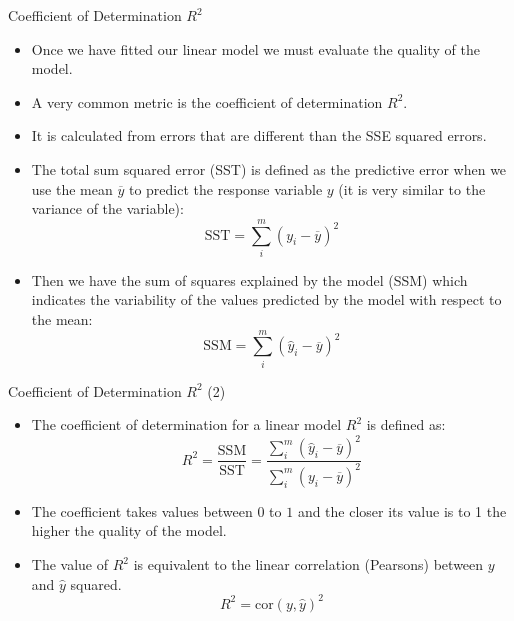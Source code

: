 \documentclass[handout]{beamer}
\begin{document}
\begin{frame}{Coefficient of Determination $R^2$}
\scriptsize{
\begin{itemize}
 \item  Once we have fitted our linear model we must evaluate the quality of the model.
 \item A very common metric is the coefficient of determination $R^2$. 
 \item  It is calculated from errors that are different than the SSE squared errors.
 \item The total sum squared error (SST)  is defined as the predictive error when we use the mean $\overline{y}$  to predict the response variable $y$ (it is very similar to the variance of the variable):
 \begin{displaymath}
  \text{SST} = \sum_{i}^{m}(y_i-\overline{y})^2  
 \end{displaymath}
 \item  Then we have the sum of squares explained by the model (SSM) which indicates the variability of the values predicted by the model with respect to the mean:
 \begin{displaymath}
  \text{SSM} = \sum_{i}^{m}(\hat{y}_i-\overline{y})^2 
 \end{displaymath}
  
\end{itemize}

}
\end{frame}

\begin{frame}{Coefficient of Determination $R^2$ (2)}
\scriptsize{
\begin{itemize}
 \item The coefficient of determination for a linear model $R^2$ is defined as:
 \begin{equation}
  R^2= \frac{\text{SSM}}{\text{SST}} = \frac{\sum_{i}^{m}(\hat{y}_i-\overline{y})^2 }{\sum_{i}^{m}(y_i-\overline{y})^2  }
 \end{equation}

 \item The coefficient takes values between $0$ to $1$ and the closer its value is to 1 the higher the quality of the model.
 
 \item The value of $R^2$ is equivalent to the linear correlation (Pearsons) between $y$ and $\hat{y}$ squared.
\begin{displaymath}
 R^2=\text{cor}(y,\hat{y})^2
\end{displaymath}
  
\end{itemize}


}
\end{frame}
\end{document}
